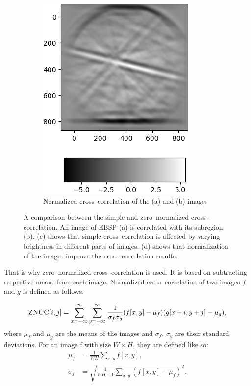 \begin{figure}
\begin{subfigure}{.49\textwidth}
		\includegraphics[width=\linewidth]{img/normalized_corr}
		\caption{Normalized cross--correlation of the (a) and (b) images}
		\label{normalized-cross}
	\end{subfigure}
	
	\caption{A comparison between the simple and zero--normalized cross--correlation. An image of EBSP (a) is correlated with its subregion (b). (c) shows that simple cross--correlation is affected by varying brightness in different parts of images. (d) shows that normalization of the images improve the cross--correlation results.}
\end{figure}

That is why zero--normalized cross--correlation is used. It is based on subtracting respective means from each image. Normalized cross--correlation of two images $f$ and $g$ is defined as follows:

\[
\textsc{ZNCC}[i,j] = \sum_{x=-\infty}^{\infty}\sum_{y=-\infty}^{\infty} \frac{1}{\sigma_f \sigma_g}(f[x,y] - \mu_f)(g[x+i,y+j] - \mu_g),
\]  
where $\mu_f$ and $\mu_g$ are the means of the images and $\sigma_f$, $\sigma_g$ are their standard deviations. For an image f with size $W \times H$, they are defined like so:
\begin{align*}
\mu_f &= \frac{1}{WH} \sum_{x,y}{}f[x,y], \\
\sigma_f &= \sqrt{\frac{1}{WH-1} \sum_{x,y}(f[x,y]-\mu_f)^2}.
\end{align*}


